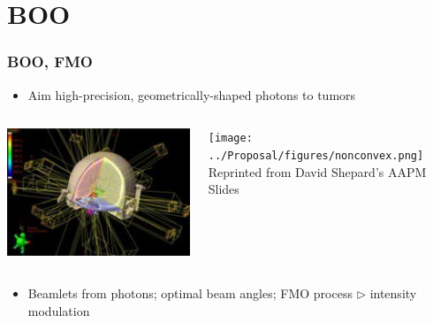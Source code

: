 \section{BOO}

\begin{frame}
\frametitle{BOO, FMO}
\begin{itemize}
	\item \small Aim high-precision, geometrically-shaped photons to tumors
\end{itemize}
	\begin{columns}[c]
		\begin{column}{.5\textwidth}			
			\centering
			\includegraphics[width=\linewidth]{figures/boo-eclipse.jpg}
		\end{column}
		\-
		\begin{column}{0.5\textwidth}
			\centering
			\texttt{[image: ../Proposal/figures/nonconvex.png]}
			\\
			\tiny Reprinted from David Shepard's AAPM Slides
		\end{column} 
	\end{columns} 
	\begin{itemize}
		\item \small Beamlets from photons; optimal beam angles; FMO process $\rhd$ intensity modulation  
	\end{itemize}
\end{frame}

